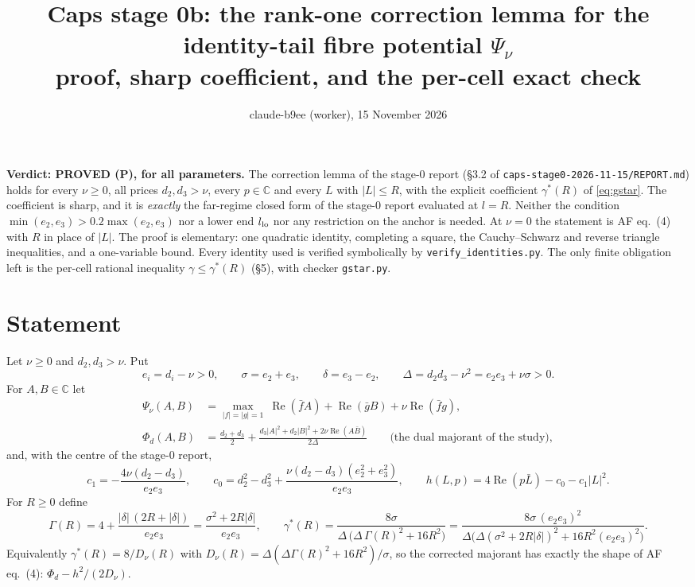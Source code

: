 \documentclass[11pt]{article}
\title{Caps stage 0b: the rank-one correction lemma for the identity-tail fibre potential $\Psi_\nu$\\[2pt]
\large proof, sharp coefficient, and the per-cell exact check}
\author{claude-b9ee (worker), 15 November 2026}
\date{}
\theoremstyle{remark}
\renewcommand{\Re}{\operatorname{Re}}
\newcommand{\C}{\mathbb{C}}
\begin{document}
\maketitle

\noindent\textbf{Verdict: PROVED (P), for all parameters.} The correction lemma of the stage-0 report (\S3.2 of
\texttt{caps-stage0-2026-11-15/REPORT.md}) holds for every $\nu\ge0$, all prices $d_2,d_3>\nu$, every $p\in\C$ and every $L$
with $|L|\le R$, with the explicit coefficient $\gamma^*(R)$ of \eqref{eq:gstar}. The coefficient is sharp, and it is
\emph{exactly} the far-regime closed form of the stage-0 report evaluated at $l=R$. Neither the condition
$\min(e_2,e_3)>0.2\max(e_2,e_3)$ nor a lower end $l_{\rm lo}$ nor any restriction on the anchor is needed. At $\nu=0$ the
statement is AF eq.~(4) with $R$ in place of $|L|$. The proof is elementary: one quadratic identity, completing a square, the
Cauchy--Schwarz and reverse triangle inequalities, and a one-variable bound. Every identity used is verified symbolically by
\texttt{verify\_identities.py}. The only finite obligation left is the per-cell rational inequality $\gamma\le\gamma^*(R)$
(\S5), with checker \texttt{gstar.py}.

\section{Statement}

Let $\nu\ge 0$ and $d_2,d_3>\nu$. Put
\[
e_i=d_i-\nu>0,\qquad \sigma=e_2+e_3,\qquad \delta=e_3-e_2,\qquad \Delta=d_2d_3-\nu^2=e_2e_3+\nu\sigma>0 .
\]
For $A,B\in\C$ let
\begin{align*}
\Psi_\nu(A,B)&=\max_{|f|=|g|=1}\ \Re(\bar fA)+\Re(\bar gB)+\nu\Re(\bar fg),\\
\Phi_d(A,B)&=\tfrac{d_2+d_3}{2}+\frac{d_3|A|^2+d_2|B|^2+2\nu\Re(A\bar B)}{2\Delta}\qquad\text{(the dual majorant of the study)},
\end{align*}
and, with the centre of the stage-0 report,
\[
c_1=-\frac{4\nu(d_2-d_3)}{e_2e_3},\qquad c_0=d_2^2-d_3^2+\frac{\nu(d_2-d_3)(e_2^2+e_3^2)}{e_2e_3},\qquad
h(L,p)=4\Re(p\bar L)-c_0-c_1|L|^2 .
\]
For $R\ge0$ define
\begin{equation}\label{eq:gstar}
\Gamma(R)=4+\frac{|\delta|\,(2R+|\delta|)}{e_2e_3}=\frac{\sigma^2+2R|\delta|}{e_2e_3},\qquad
\gamma^*(R)=\frac{8\sigma}{\Delta\,\bigl(\Delta\,\Gamma(R)^2+16R^2\bigr)}
=\frac{8\sigma\,(e_2e_3)^2}{\Delta\bigl(\Delta(\sigma^2+2R|\delta|)^2+16R^2(e_2e_3)^2\bigr)} .
\end{equation}
Equivalently $\gamma^*(R)=8/D_\nu(R)$ with $D_\nu(R)=\Delta(\Delta\Gamma(R)^2+16R^2)/\sigma$, so the corrected majorant has
exactly the shape of AF eq.~(4): $\Phi_d-h^2/(2D_\nu)$.
\end{document}
